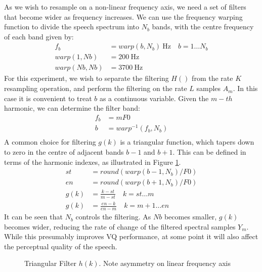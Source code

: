 \documentclass{article}
\begin{document}
As we wish to resample on a non-linear frequency axis, we need a set of filters that become wider as frequency increases. We can use the frequency warping function to divide the speech spectrum into $N_b$ bands, with the centre frequency of each band given by:
\begin{equation}
\begin{split}
f_b &= warp(b,N_b) \ \textrm{Hz} \quad b=1 \ldots N_b \\
warp(1,Nb) &= 200 \ \textrm{Hz} \\
warp(Nb,Nb) &= 3700 \ \textrm{Hz}
\end{split}
\end{equation}
For this experiment, we wish to separate the filtering $H()$ from the rate $K$ resampling operation, and perform the filtering on the rate $L$ samples $A_m$.  In this case it is convenient to treat $b$ as a continuous variable.  Given the $m-th$ harmonic, we can determine the filter band:
\begin{equation}
\begin{split}
f_b &= mF0 \\
b &= warp^{-1}(f_b,N_b) \\
\end{split}
\end{equation}
A common choice for filtering $g(k)$ is a triangular function, which tapers down to zero in the centre of adjacent bands $b-1$ and $b+1$.  This can be defined in terms of the harmonic indexes, as illustrated in  Figure \ref{fig:triangle_filter}.
\begin{equation}
\begin{split}
st &= round(warp(b-1,N_b)/F0) \\
en &= round(warp(b+1,N_b)/F0) \\
g(k) &= \frac{k-st}{m-st} \quad k=st \ldots m \\
g(k) &= \frac{en-k}{en-m} \quad k=m+1 \ldots en
\end{split}
\end{equation}
It can be seen that $N_b$ controls the filtering.  As $Nb$ becomes smaller, $g(k)$ becomes wider, reducing the rate of change of the filtered spectral samples $Y_m$.  While this presumably improves VQ performance, at some point it will also affect the perceptual quality of the speech.

\begin{figure}[h]
\caption{Triangular Filter $h(k)$.  Note asymmetry on linear frequency axis}
\vspace{5mm}
\label{fig:triangle_filter}
\centering
{}
\end{figure}
\end{document}
